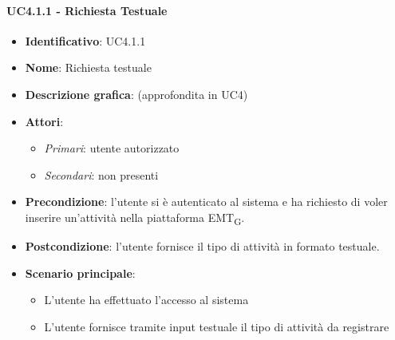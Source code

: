 \paragraph{UC4.1.1 - Richiesta Testuale}
\begin{itemize}
   \item \textbf{Identificativo}: UC4.1.1
   \item \textbf{Nome}: Richiesta testuale
   \item \textbf{Descrizione grafica}: (approfondita in UC4)
   \item \textbf{Attori}:
   \begin{itemize} 
       \item \textit{Primari}: utente autorizzato
       \item \textit{Secondari}: non presenti
   \end{itemize}
       \item \textbf{Precondizione}: l'utente si è autenticato al sistema e ha richiesto di voler inserire un'attività nella piattaforma EMT\textsubscript{G}. 
       \item \textbf{Postcondizione}: l'utente fornisce il tipo di attività in formato testuale. 
    \item \textbf{Scenario principale}: 
       \begin{itemize}
           \item L'utente ha effettuato l'accesso al sistema 
           \item L'utente fornisce tramite input testuale il tipo di attività da  registrare
       \end{itemize}
\end{itemize}

